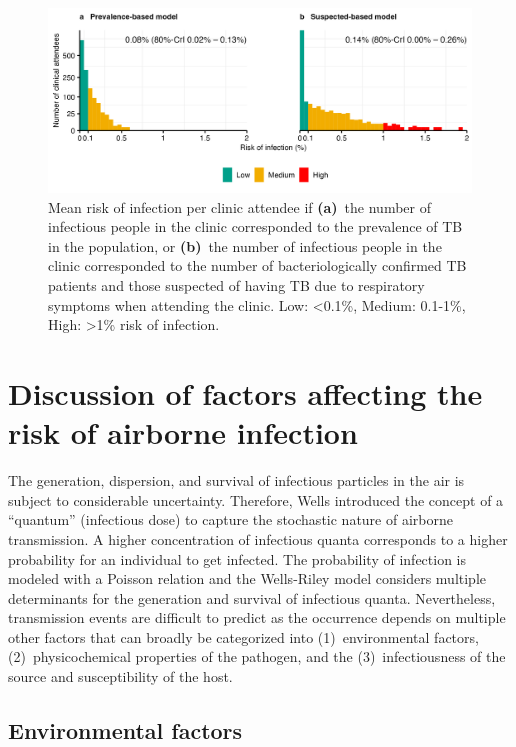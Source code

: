 \documentclass[fleqn,11pt]{wlscirep_supp}
\begin{document}
\begin{figure}[!htpb]
    \centering
    \includegraphics{results/modeling/mean-roi-assumptions.png}
    \caption{Mean risk of infection per clinic attendee if \textbf{(a)}~the number of infectious people in the clinic corresponded to the prevalence of TB in the population, or \textbf{(b)}~the number of infectious people in the clinic corresponded to the number of bacteriologically confirmed TB patients and those suspected of having TB due to respiratory symptoms when attending the clinic. Low: <0.1\%, Medium: 0.1-1\%, High: >1\% risk of infection.}
    \label{fig:assumptions-results}
\end{figure}

\clearpage

\section{Discussion of factors affecting the risk of airborne infection}\label{sec:depth-discussion}


The generation, dispersion, and survival of infectious particles in the air is subject to considerable uncertainty. Therefore, Wells\cite{Wells1955} introduced the concept of a ``quantum'' (infectious dose) to capture the stochastic nature of airborne transmission. A higher concentration of infectious quanta corresponds to a higher probability for an individual to get infected. The probability of infection is modeled with a Poisson relation and the Wells-Riley model considers multiple determinants for the generation and survival of infectious quanta. Nevertheless, transmission events are difficult to predict as the occurrence depends on multiple other factors that can broadly be categorized into (1)~environmental factors, (2)~physicochemical properties of the pathogen, and the (3)~infectiousness of the source and susceptibility of the host. 

\subsection{Environmental factors}
\end{document}

